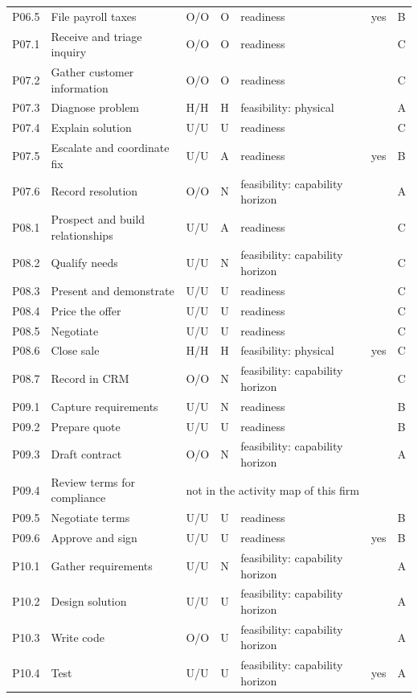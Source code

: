 \begin{longtable}{@{}lp{4.4cm}llp{4.2cm}rll@{}}
P06.5 & File payroll taxes & O/O & O & readiness &  & yes & B \\
P07.1 & Receive and triage inquiry & O/O & O & readiness &  &  & C \\
P07.2 & Gather customer information & O/O & O & readiness &  &  & C \\
P07.3 & Diagnose problem & H/H & H & feasibility: physical &  &  & A \\
P07.4 & Explain solution & U/U & U & readiness &  &  & C \\
P07.5 & Escalate and coordinate fix & U/U & A & readiness &  & yes & B \\
P07.6 & Record resolution & O/O & N & feasibility: capability horizon &  &  & A \\
P08.1 & Prospect and build relationships & U/U & A & readiness &  &  & C \\
P08.2 & Qualify needs & U/U & N & feasibility: capability horizon &  &  & C \\
P08.3 & Present and demonstrate & U/U & U & readiness &  &  & C \\
P08.4 & Price the offer & U/U & U & readiness &  &  & C \\
P08.5 & Negotiate & U/U & U & readiness &  &  & C \\
P08.6 & Close sale & H/H & H & feasibility: physical &  & yes & C \\
P08.7 & Record in CRM & O/O & N & feasibility: capability horizon &  &  & C \\
P09.1 & Capture requirements & U/U & N & readiness &  &  & B \\
P09.2 & Prepare quote & U/U & U & readiness &  &  & B \\
P09.3 & Draft contract & O/O & N & feasibility: capability horizon &  &  & A \\
P09.4 & Review terms for compliance & \multicolumn{6}{l}{not in the activity map of this firm} \\
P09.5 & Negotiate terms & U/U & U & readiness &  &  & B \\
P09.6 & Approve and sign & U/U & U & readiness &  & yes & B \\
P10.1 & Gather requirements & U/U & N & feasibility: capability horizon &  &  & A \\
P10.2 & Design solution & U/U & U & feasibility: capability horizon &  &  & A \\
P10.3 & Write code & O/O & U & feasibility: capability horizon &  &  & A \\
P10.4 & Test & U/U & U & feasibility: capability horizon &  & yes & A \\

\end{longtable}
